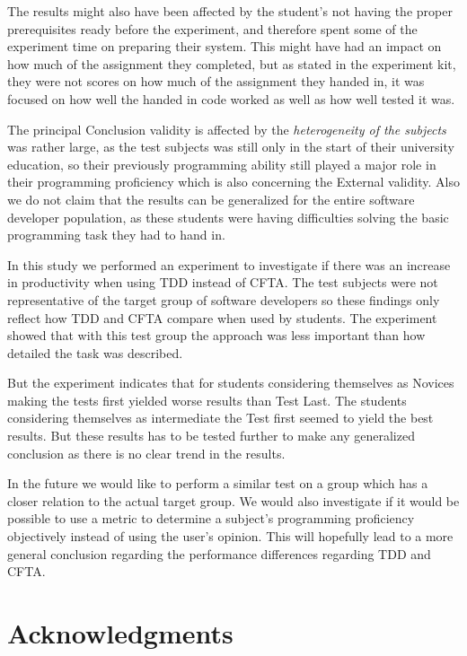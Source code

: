 \documentclass{sig-alternate-05-2015}
\begin{document}
The results might also have been affected by the student's not having the proper prerequisites ready before the experiment, and therefore spent some of the experiment time on preparing their system. This might have had an impact on how much of the assignment they completed, but as stated in the experiment kit, they were not scores on how much of the assignment they handed in, it was focused on how well the handed in code worked as well as how well tested it was.

The principal Conclusion validity is affected by the \textit{heterogeneity of the subjects} was rather large, as the test subjects was still only in the start of their university education, so their previously programming ability still played a major role in their programming proficiency which is also concerning the External validity. Also we do not claim that the results can be generalized for the entire software developer population, as these students were having difficulties solving the basic programming task they had to hand in. 

\label{sec:Conclusion}
In this study we performed an experiment to investigate if there was an increase in productivity when using TDD instead of CFTA. The test subjects were not representative of the target group of software developers so these findings only reflect how TDD and CFTA compare when used by students. The experiment showed that with this test group the approach was less important than how detailed the task was described.

But the experiment indicates that for students considering themselves as Novices making the tests first yielded worse results than Test Last. The students considering themselves as intermediate the Test first seemed to yield the best results. But these results has to be tested further to make any generalized conclusion as there is no clear trend in the results.

In the future we would like to perform a similar test on a group which has a closer relation to the actual target group. We would also investigate if it would be possible to use a metric to determine a subject's programming proficiency objectively instead of using the user's opinion. This will hopefully lead to a more general conclusion regarding the performance differences regarding TDD and CFTA.




\section{Acknowledgments}
\end{document}
